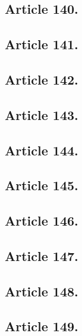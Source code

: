 \subsection{Article 140.}

\subsection{Article 141.}

\subsection{Article 142.}

\subsection{Article 143.}

\subsection{Article 144.}

\subsection{Article 145.}

\subsection{Article 146.}

\subsection{Article 147.}

\subsection{Article 148.}

\subsection{Article 149.}

